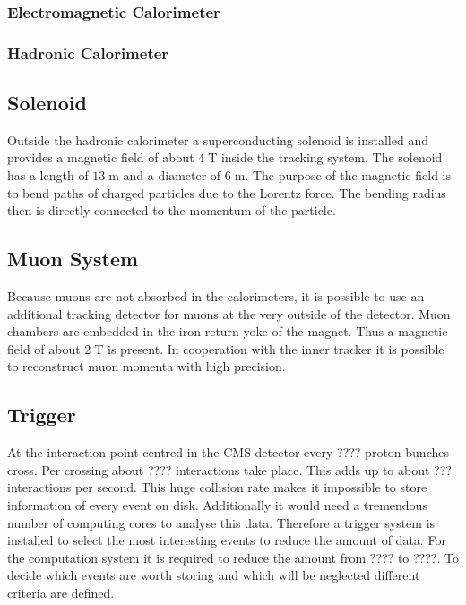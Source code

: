 \subsubsection{Electromagnetic Calorimeter}
\subsubsection{Hadronic Calorimeter}
	
\subsection{Solenoid}
	Outside the hadronic calorimeter a superconducting solenoid is installed and provides a magnetic field of about $4\;\text{T}$ inside the tracking system. The solenoid has a length of $13\;\text{m}$ and a diameter of $6\;\text{m}$. The purpose of the magnetic field is to bend paths of charged particles due to the Lorentz force. The bending radius then is directly connected to the momentum of the particle.  
\subsection{Muon System}
\label{sec:muonsystem}
	Because muons are not absorbed in the calorimeters, it is possible to use an additional tracking detector for muons at the very outside of the detector. Muon chambers are embedded in the iron return yoke of the magnet. Thus a magnetic field of about $2\;\text{T}$ is present.
	In cooperation with the inner tracker it is possible to reconstruct muon momenta with high precision.
\subsection{Trigger}
	At the interaction point centred in the CMS detector every ???? 
	proton bunches cross. Per crossing about ????
	interactions take place. This adds up to about ???
	interactions per second. This huge collision rate makes it impossible to store information of every event on disk. Additionally it would need a tremendous number of computing cores to analyse this data. Therefore a trigger system is installed to select the most interesting events to reduce the amount of data. For the computation system it is required to reduce the amount from ???? to ????.
 	To decide which events are worth storing and which will be neglected different criteria are defined.
	
	